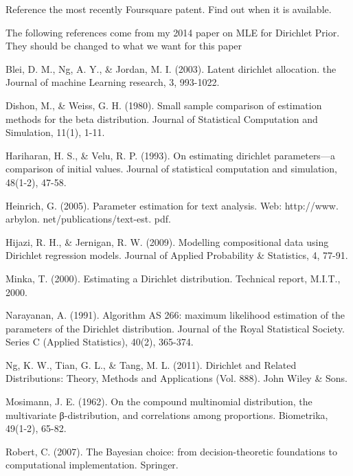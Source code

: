 \documentclass[twoside]{article}
\begin{document}
Reference the most recently Foursquare patent. Find out when it is available.

The following references come from my 2014 paper on MLE for Dirichlet Prior. They should be changed to what we want for this paper


\begin{thebibliography}{20}

Blei, D. M., Ng, A. Y., \& Jordan, M. I. (2003). Latent dirichlet allocation. the Journal of machine Learning research, 3, 993-1022.

Dishon, M., \& Weiss, G. H. (1980). Small sample comparison of estimation methods for the beta distribution. Journal of Statistical Computation and Simulation, 11(1), 1-11.

Hariharan, H. S., \& Velu, R. P. (1993). On estimating dirichlet parameters—a comparison of initial values. Journal of statistical computation and simulation, 48(1-2), 47-58.

Heinrich, G. (2005). Parameter estimation for text analysis. Web: http://www. arbylon. net/publications/text-est. pdf.

Hijazi, R. H., \& Jernigan, R. W. (2009). Modelling compositional data using Dirichlet regression models. Journal of Applied Probability \& Statistics, 4, 77-91.

Minka, T. (2000). Estimating a Dirichlet distribution. Technical report, M.I.T., 2000.

Narayanan, A. (1991). Algorithm AS 266: maximum likelihood estimation of the parameters of the Dirichlet distribution. Journal of the Royal Statistical Society. Series C (Applied Statistics), 40(2), 365-374.

Ng, K. W., Tian, G. L., \& Tang, M. L. (2011). Dirichlet and Related Distributions: Theory, Methods and Applications (Vol. 888). John Wiley \& Sons.

Mosimann, J. E. (1962). On the compound multinomial distribution, the multivariate β-distribution, and correlations among proportions. Biometrika, 49(1-2), 65-82.

Robert, C. (2007). The Bayesian choice: from decision-theoretic foundations to computational implementation. Springer.


\end{thebibliography}
\end{document}
